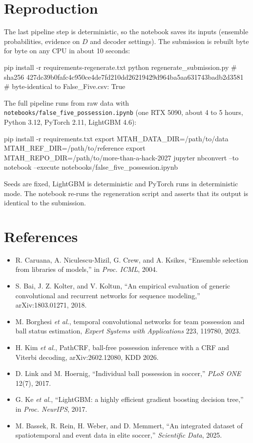 \documentclass[10pt]{article}
\begin{document}
\section*{Reproduction}
The last pipeline step is deterministic, so the notebook saves its inputs (ensemble probabilities, evidence on $D$ and decoder settings). The submission is rebuilt byte for byte on any CPU in about 10 seconds:
\begin{shellcode}
pip install -r requirements-regenerate.txt
python regenerate_submission.py
# sha256 427dc39b0fafc4c950ce4de7fd210dd26219429d964ba5aa631743badb2d3581
# byte-identical to False_Five.csv: True
\end{shellcode}
The full pipeline runs from raw data with \texttt{notebooks/false\_five\_possession.ipynb} (one RTX 5090, about 4 to 5 hours, Python 3.12, PyTorch 2.11, LightGBM 4.6):
\begin{shellcode}
pip install -r requirements.txt
export MTAH_DATA_DIR=/path/to/data  MTAH_REF_DIR=/path/to/reference
export MTAH_REPO_DIR=/path/to/more-than-a-hack-2027
jupyter nbconvert --to notebook --execute notebooks/false_five_possession.ipynb
\end{shellcode}
Seeds are fixed, LightGBM is deterministic and PyTorch runs in deterministic mode. The notebook re-runs the regeneration script and asserts that its output is identical to the submission.

\section*{References}
\begin{itemize}[leftmargin=2em]
\item[{[1]}] R. Caruana, A. Niculescu-Mizil, G. Crew, and A. Ksikes, ``Ensemble selection from libraries of models,'' in \textit{Proc. ICML}, 2004.
\item[{[2]}] S. Bai, J. Z. Kolter, and V. Koltun, ``An empirical evaluation of generic convolutional and recurrent networks for sequence modeling,'' arXiv:1803.01271, 2018.
\item[{[3]}] M. Borghesi \textit{et al.}, temporal convolutional networks for team possession and ball status estimation, \textit{Expert Systems with Applications} 223, 119780, 2023.
\item[{[4]}] H. Kim \textit{et al.}, PathCRF, ball-free possession inference with a CRF and Viterbi decoding, arXiv:2602.12080, KDD 2026.
\item[{[5]}] D. Link and M. Hoernig, ``Individual ball possession in soccer,'' \textit{PLoS ONE} 12(7), 2017.
\item[{[6]}] G. Ke \textit{et al.}, ``LightGBM: a highly efficient gradient boosting decision tree,'' in \textit{Proc. NeurIPS}, 2017.
\item[{[7]}] M. Bassek, R. Rein, H. Weber, and D. Memmert, ``An integrated dataset of spatiotemporal and event data in elite soccer,'' \textit{Scientific Data}, 2025.
\end{itemize}
\end{document}
